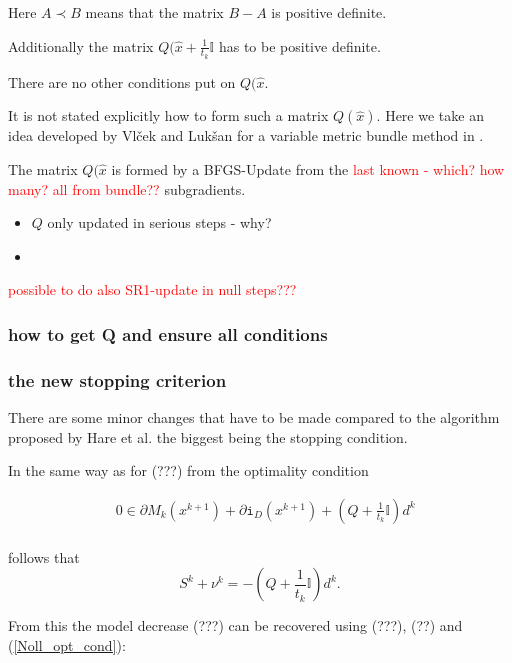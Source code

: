 Here \(A \prec B \) means that the matrix \(B-A\) is positive definite.

Additionally the matrix \(Q(\hat{x}+\frac{1}{t_k}\mathbb{I}\) has to be positive definite.

There are no other conditions put on \(Q(\hat{x}\).

It is not stated explicitly how to form such a matrix \(Q(\hat{x})\). Here we take an idea developed by Vl\v{c}ek  and Luk\v{s}an for a variable metric bundle method in \cite{Vlcek2001}.

The matrix \(Q(\hat{x}\) is formed by a BFGS-Update from the \textcolor{red}{last known - which? how many? all from bundle??} subgradients.



\begin{itemize}
	\item \(Q\) only updated in serious steps - why?
	\item 
\end{itemize}


\textcolor{red}{possible to do also SR1-update in null steps???}

\subsubsection{how to get Q and ensure all conditions}

\subsubsection{the new stopping criterion}

There are some minor changes that have to be made compared to the algorithm proposed by Hare et al. the biggest being the stopping condition.

In the same way as for (???) from the optimality condition

\begin{align}
	& 0 \in \partial M_k(x^{k+1})+\partial\mathtt{i}_{D}(x^{k+1})+\left(Q+\frac{1}{t_k}\mathbb{I}\right)d^k \\
	\label{Noll_opt_cond}
\end{align}

follows that 
\begin{equation}
	S^k+\nu^k = -\left(Q+\frac{1}{t_k}\mathbb{I}\right)d^k.
\end{equation}

From this the model decrease (???) can be recovered using (???), (??) and (\ref{Noll_opt_cond}):

